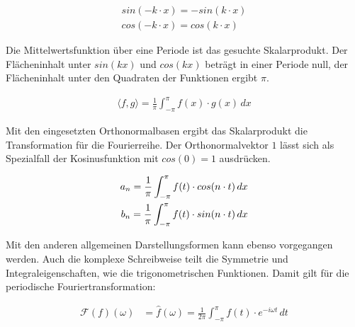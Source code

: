 \begin{align}
  sin(- k \cdot x) = - sin(k \cdot x) \\
  cos(- k \cdot x) = cos ( k \cdot x)
\end{align}

Die Mittelwertsfunktion über eine Periode ist das gesuchte Skalarprodukt. Der Flächeninhalt unter $sin(k x)$ und $cos(k x)$ beträgt in einer Periode null, der Flächeninhalt unter den Quadraten der Funktionen ergibt $\pi$.

\begin{align}
  \langle f, g \rangle = \frac{1}{\pi} \int_{-\pi}^{\pi} f(x) \cdot g(x) \, dx
\end{align}

Mit den eingesetzten Orthonormalbasen ergibt das Skalarprodukt die Transformation für die Fourierreihe. Der Orthonormalvektor $1$ lässt sich als Spezialfall der Kosinusfunktion mit $cos(0) = 1$ ausdrücken.

\begin{align}
  a_n = \frac{1}{\pi} \int_{-\pi}^{\pi} f(t) \cdot cos(n \cdot t) \, dx \notag\\
  b_n = \frac{1}{\pi} \int_{-\pi}^{\pi} f(t) \cdot sin(n \cdot t) \, dx
\end{align}

Mit den anderen allgemeinen Darstellungsformen kann ebenso vorgegangen werden. Auch die komplexe Schreibweise teilt die Symmetrie und Integraleigenschaften, wie die trigonometrischen Funktionen. Damit gilt für die periodische Fouriertransformation:

\begin{align}
  \mathcal{F}(f)(\omega) &= \hat{f}(\omega) = \frac{1}{2 \pi} \int_{-\pi}^{\pi} f(t) \cdot e^{-i \omega t} \, dt
\end{align}

